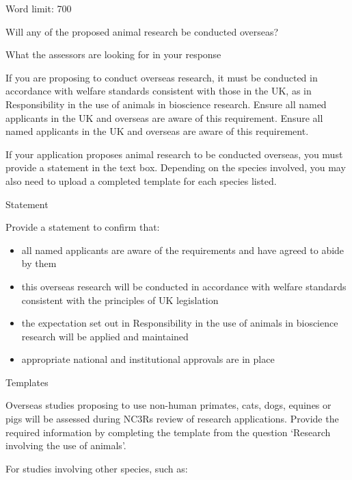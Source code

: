 \documentclass[12pt]{article}
\newenvironment{instruction}{\par\color{red}}{\par}
\begin{document}
\begin{instruction}

Word limit: 700

Will any of the proposed animal research be conducted overseas?

What the assessors are looking for in your response

If you are proposing to conduct overseas research, it must be conducted in
accordance with welfare standards consistent with those in the UK, as in
Responsibility in the use of animals in bioscience research. Ensure all
named applicants in the UK and overseas are aware of this requirement.
Ensure all named applicants in the UK and overseas are aware of this
requirement.

If your application proposes animal research to be conducted overseas, you
must provide a statement in the text box. Depending on the species involved,
you may also need to upload a completed template for each species listed.

Statement

Provide a statement to confirm that:

\begin{itemize}

	\item all named applicants are aware of the requirements and have agreed to
abide by them

	\item this overseas research will be conducted in accordance with welfare
standards consistent with the principles of UK legislation

	\item the expectation set out in Responsibility in the use of animals in bioscience
research will be applied and maintained

	\item appropriate national and institutional approvals are in place

\end{itemize}

Templates

Overseas studies proposing to use non-human primates, cats, dogs, equines or
pigs will be assessed during NC3Rs review of research applications. Provide
the required information by completing the template from the question
‘Research involving the use of animals’.

For studies involving other species, such as:

\begin{itemize}


\end{itemize}
\end{instruction}
\end{document}

